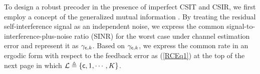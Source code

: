 \documentclass[draftclsnofoot, onecolumn, comsoc, 12pt]{IEEEtran}
\begin{document}
 
To design a robust precoder in the presence of imperfect CSIT and CSIR, we first employ a concept of the generalized mutual information \cite{an2021rate,lee2022max, 9894281}. By treating the residual self-interference signal as an independent noise, we express the common signal-to-interference-plus-noise ratio (SINR) for the worst case under channel estimation error and represent it as $\gamma_{{\sf{c}},k}$.
Based on $\gamma_{{\sf{c}},k}$, we express the common rate in an ergodic form with respect to the feedback error as (\ref{RCEq1}) at the top of the next page in which $\mathcal{L} \triangleq \{{\sf c}, 1, \cdots, K\}$.
\end{document}
